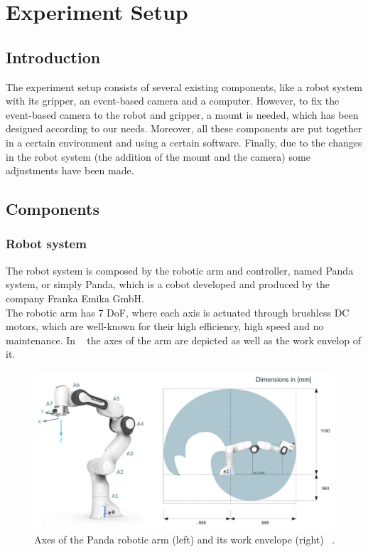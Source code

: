 \cleardoublepage
\chapter{Experiment Setup}\label{sec:setup}

\section{Introduction}

The experiment setup consists of several existing components, like a robot system with its gripper, an event-based camera and a computer. However, to fix the event-based camera to the robot and gripper, a mount is needed, which has been designed according to our needs. Moreover, all these components are put together in a certain environment and using a certain software. Finally, due to the changes in the robot system (the addition of the mount and the camera) some adjustments have been made.

\section{Components}
\subsection{Robot system}

The robot system is composed by the robotic arm and controller, named Panda system, or simply Panda, which is a cobot developed and produced by the company Franka Emika GmbH.\\

The robotic arm has 7 DoF, where each axis is actuated through brushless DC motors, which are well-known for their high efficiency, high speed and no maintenance. In ~ the axes of the arm are depicted as well as the work envelop of it.\\

\begin{figure}[h]
    \centering
    \includegraphics[width=\textwidth]{resources/images/pandarobot}
    \caption{Axes of the Panda robotic arm (left) and its work envelope (right) ~\cite{panda}.}\label{fig:pandarobot}
\end{figure}

